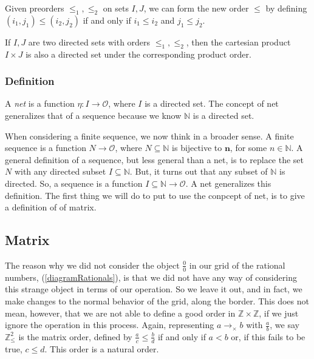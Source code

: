\documentclass [12pt]{book}
\begin{document}
Given preorders $\leq_1,\leq_2$ on sets $I,J$, we can form the new order $\leq$ by defining $(i_1,j_1)\leq(i_2,j_2)$ if and only if $i_1\leq i_2$ and $j_1\leq j_2$.

\begin{proposition}If $I,J$ are two directed sets with orders $\leq_1,\leq_2$, then the cartesian product $I\times J$ is also a directed set under the corresponding product order.\end{proposition}

		\subsubsection{Definition}

A \textit{net} is a function $\eta:I\rightarrow\mathcal{O}$, where $I$ is a directed set. The concept of net generalizes that of a sequence because we know $\mathbb{N}$ is a directed set. 

When considering a finite sequence, we now think in a broader sense. A finite sequence is a function $N\rightarrow \mathcal{O}$, where $N\subseteq\mathbb{N}$ is bijective to $\textbf{n}$, for some $n\in\mathbb{N}$. A general definition of a sequence, but less general than a net, is to replace the set $N$ with any directed subset $I\subseteq\mathbb{N}$. But, it turns out that any subset of $\mathbb{N}$ is directed. So, a sequence is a function $I\subseteq\mathbb{N}\rightarrow\mathcal{O}$. A net generalizes this definition. The first thing we will do to put to use the conpcept of net, is to give a definition of of matrix.

	\subsection{Matrix}

The reason why we did not consider the object $\frac{0}{0}$ in our grid of the rational numbers, (\ref{diagramRationals}), is that we did not have any way of considering this strange object in terms of our operation. So we leave it out, and in fact, we make changes to the normal behavior of the grid, along the border. This does not mean, however, that we are not able to define a good order in $\mathbb{Z}\times\mathbb{Z}$, if we just ignore the operation in this process. Again, representing $a\rightarrow_\times b$ with $\frac{a}{b}$, we say $\mathbb{Z}^2_{\leq}$ is the matrix order, defined by $\frac{a}{c}\leq\frac{b}{d}$ if and only if $a<b$ or, if this fails to be true, $c\leq d$. This order is a natural order.
\end{document}
